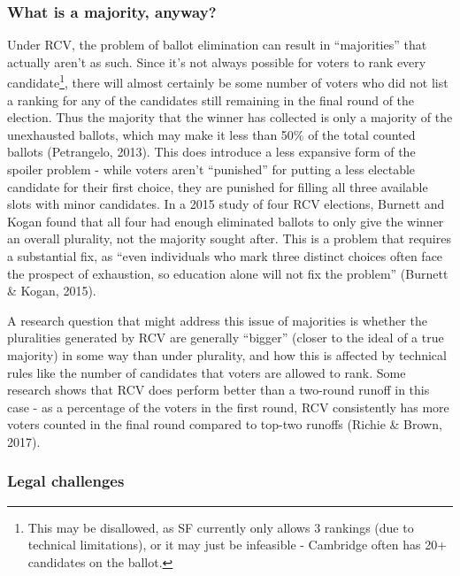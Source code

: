 \documentclass[12pt,twoside]{reedthesis}
\begin{document}
\hypertarget{what-is-a-majority-anyway}{%
\subsubsection{What is a majority, anyway?}\label{what-is-a-majority-anyway}}

Under RCV, the problem of ballot elimination can result in ``majorities'' that actually aren't as such. Since it's not always possible for voters to rank every candidate\footnote{This may be disallowed, as SF currently only allows 3 rankings (due to technical limitations), or it may just be infeasible - Cambridge often has 20+ candidates on the ballot.}, there will almost certainly be some number of voters who did not list a ranking for any of the candidates still remaining in the final round of the election. Thus the majority that the winner has collected is only a majority of the unexhausted ballots, which may make it less than 50\% of the total counted ballots (Petrangelo, 2013). This does introduce a less expansive form of the spoiler problem - while voters aren't ``punished'' for putting a less electable candidate for their first choice, they are punished for filling all three available slots with minor candidates. In a 2015 study of four RCV elections, Burnett and Kogan found that all four had enough eliminated ballots to only give the winner an overall plurality, not the majority sought after. This is a problem that requires a substantial fix, as ``even individuals who mark three distinct choices often face the prospect of exhaustion, so education alone will not fix the problem'' (Burnett \& Kogan, 2015).

A research question that might address this issue of majorities is whether the pluralities generated by RCV are generally ``bigger'' (closer to the ideal of a true majority) in some way than under plurality, and how this is affected by technical rules like the number of candidates that voters are allowed to rank. Some research shows that RCV does perform better than a two-round runoff in this case - as a percentage of the voters in the first round, RCV consistently has more voters counted in the final round compared to top-two runoffs (Richie \& Brown, 2017).

\hypertarget{legal-challenges}{%
\subsubsection{Legal challenges}\label{legal-challenges}}
\end{document}
